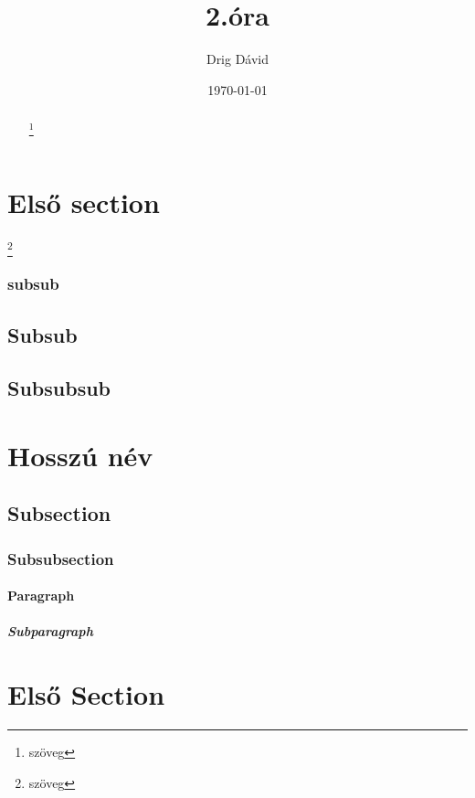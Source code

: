 \documentclass{article}
\begin{document}
\title{2.óra}
\author{Drig Dávid}
\date{\today}
\renewcommand{\thefootnote}{\fnsymbol{footnote}}
\maketitle

\begin{abstract}
\hulipsum[1]
\blindtext[1]
\footnote{szöveg}
\end{abstract}


\setcounter{tocdepth}{5} 
\tableofcontents
{}

\clearpage

\setcounter{secnumdepth}{5}

\section{Első section}\footnote{szöveg}
\subsubsection{subsub}

\subsection{Subsub}
\hulipsum
\subsection{Subsubsub}
\hulipsum

\section[Rövid név]{Hosszú név}
\subsection{Subsection}
\subsubsection{Subsubsection}
\paragraph{Paragraph}
\subparagraph{Subparagraph}

\appendix
\section{Első Section}
\end{document}

